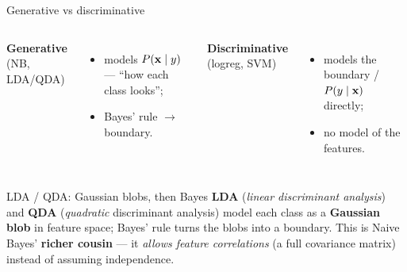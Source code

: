 \documentclass[aspectratio=169]{beamer}
\begin{document}
\begin{frame}{Generative vs discriminative}
  \begin{columns}[T]
    \textbf{Generative} (NB, LDA/QDA)
    \begin{itemize}\small
      \item models $P(\mathbf{x} \mid y)$ --- ``how each class looks'';
      \item Bayes' rule $\to$ boundary.
    \end{itemize}
    \textbf{Discriminative} (logreg, SVM)
    \begin{itemize}\small
      \item models the boundary / $P(y\mid\mathbf{x})$ directly;
      \item no model of the features.
    \end{itemize}
  \end{columns}
  \vfill
\end{frame}

\begin{frame}{LDA / QDA: Gaussian blobs, then Bayes}
  \textbf{LDA} (\emph{linear discriminant analysis}) and \textbf{QDA} (\emph{quadratic} discriminant
  analysis) model each class as a \textbf{Gaussian blob} in feature space; Bayes' rule turns the
  blobs into a boundary. This is Naive Bayes' \textbf{richer cousin} --- it \emph{allows feature
  correlations} (a full covariance matrix) instead of assuming independence.
  \vfill
\end{frame}
\end{document}
